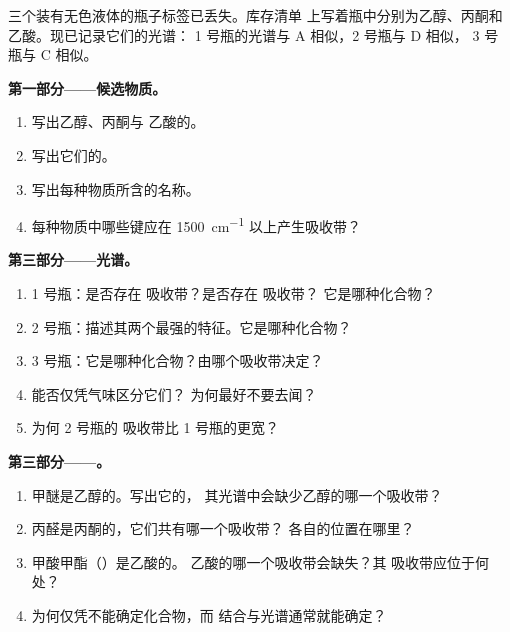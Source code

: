 \begin{problem}
\label{pb:g11:infrared:1}
三个装有无色液体的瓶子标签已丢失。库存清单
上写着瓶中分别为乙醇、丙酮和乙酸。现已记录它们的光谱：
1 号瓶的光谱与 A 相似，2 号瓶与 D 相似，
3 号瓶与 C 相似。

\medskip
\noindent\textbf{第一部分——候选物质。}
\begin{enumerate}
  \item 写出乙醇、丙酮与
        乙酸的。
  \item 写出它们的。
  \item 写出每种物质所含的名称。
  \item 每种物质中哪些键应在
        \qty{1500}{cm^{-1}} 以上产生吸收带？
\end{enumerate}

\medskip
\noindent\textbf{第三部分——光谱。}
\begin{enumerate}[resume]
  \item 1 号瓶：是否存在  吸收带？是否存在  吸收带？
        它是哪种化合物？
  \item 2 号瓶：描述其两个最强的特征。它是哪种化合物？
  \item 3 号瓶：它是哪种化合物？由哪个吸收带决定？
  \item 能否仅凭气味区分它们？
        为何最好不要去闻？
  \item 为何 2 号瓶的  吸收带比 1 号瓶的更宽？
\end{enumerate}

\medskip
\noindent\textbf{第三部分——。}
\begin{enumerate}[resume]
  \item 甲醚是乙醇的。写出它的，
        其光谱中会缺少乙醇的哪一个吸收带？
  \item 丙醛是丙酮的，它们共有哪一个吸收带？
        各自的位置在哪里？
  \item 甲酸甲酯（）是乙酸的。
        乙酸的哪一个吸收带会缺失？其
         吸收带应位于何处？
  \item 为何仅凭不能确定化合物，而
        结合与光谱通常就能确定？
\end{enumerate}


\end{problem}
